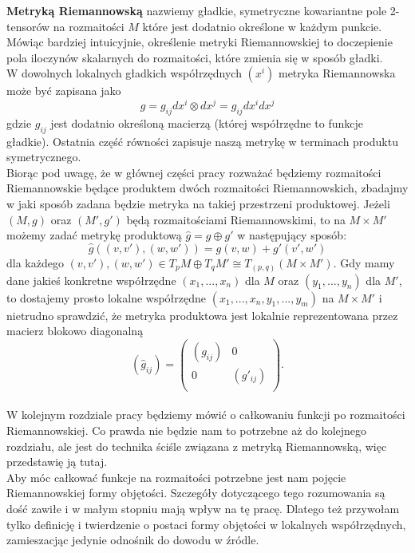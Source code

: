 \documentclass[licencjacka]{pracamgr}
\theoremstyle{definition}
\theoremstyle{definition}
\theoremstyle{plain}
\theoremstyle{plain}
\theoremstyle{plain}
\theoremstyle{plain}
\begin{document}
\textbf{Metryką Riemannowską} nazwiemy gładkie, symetryczne kowariantne
pole 2-tensorów na rozmaitości
$M$ które jest dodatnio określone w każdym punkcie. Mówiąc bardziej
intuicyjnie, określenie metryki Riemannowskiej to doczepienie 
pola iloczynów skalarnych do rozmaitości, które zmienia się w sposób gładki.
\\

W dowolnych lokalnych gładkich współrzędnych $(x^i)$ metryka Riemannowska
może być zapisana jako
\[ %
    g = g_{ij} dx^i \otimes dx^j = g_{ij} dx^i dx^j
\]
gdzie
$g_{ij}$
jest dodatnio określoną macierzą (której współrzędne to funkcje gładkie). Ostatnia
część równości zapisuje naszą metrykę w terminach produktu symetrycznego. \\

Biorąc pod uwagę, że w głównej części pracy rozważać będziemy
rozmaitości Riemannowskie będące produktem dwóch rozmaitości
Riemannowskich, zbadajmy w jaki sposób zadana będzie metryka na takiej
przestrzeni produktowej. Jeżeli $(M, g)$ oraz $(M', g')$ będą rozmaitościami
Riemannowskimi, to na $M \times M'$ możemy zadać metrykę produktową
 $\hat g = g \oplus g'$ w następujący sposób:
\[
\hat g
 \left( (v, v'), (w, w') \right) =
 g(v, w) + g'(v', w')
\]
dla każdego
 $(v, v'), (w, w') \in T_p M \oplus T_q M' \cong T_{(p, q)} (M \times M')$.
Gdy mamy dane jakieś konkretne współrzędne $(x_1, ... , x_n)$ dla $M$ oraz
$(y_1, ..., y_n)$ dla $M'$, to dostajemy prosto lokalne współrzędne
$(x_1, ..., x_n, y_1, ..., y_m)$ na $M \times M'$ i nietrudno sprawdzić, 
że metryka produktowa jest lokalnie reprezentowana przez macierz blokowo diagonalną
\[
  \left(\hat g_{ij} \right)  = 
  \left(
    \begin{array}{cc}
  \left( g_{ij} \right) &  0 \\
      0      & \left( g'_{ij} \right) \\
      \end{array}
  \right).
\] \\

W kolejnym rozdziale pracy będziemy mówić o całkowaniu funkcji po rozmaitości
Riemannowskiej. Co prawda nie będzie nam to potrzebne aż do kolejnego 
rozdziału, ale jest do technika ściśle związana z metryką Riemannowską, więc
przedstawię ją tutaj. \\

Aby móc całkować funkcje na rozmaitości potrzebne jest nam pojęcie
Riemannowskiej formy objętości. Szczegóły dotyczącego tego rozumowania 
są dość zawiłe i w małym stopniu mają wpływ na tę pracę. Dlatego też
przywołam tylko definicję i twierdzenie o postaci formy objętości
w lokalnych współrzędnych, zamieszacjąc jedynie odnośnik do dowodu w 
źródle. \\
\end{document}
